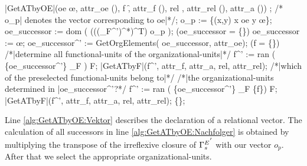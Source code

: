 	\begin{samepage}
	{\small
	\NumberProgramstrue
	\begin{algorithm}[GetATbyOE]\label{alg:GetATbyOE}
	\begin{program}
	\FUNCT |GetATbyOE|(oe \subset \oe, attr_{oe} \subset (\Bezeichner \times \WerteMenge), f \subset \f,
	attr_{f} \subset (\Bezeichner \times \WerteMenge), rel \in \relname, attr_{rel} \subset (\Bezeichner \times \WerteMenge),
	attr_a \subset (\Bezeichner \times \WerteMenge)) \subset \a
	\BEGIN
	\var {};
	/* o_{p}| denotes the vector corresponding to oe|*/;
	o_{p} := \{(x,y) \vert x \in oe \wedge y \in \oe \};\label{alg:GetATbyOE:Vektor}
	oe_{successor} := dom \left( \left({\left({\left({\relstrukturOE_F}^{'}\right)}^{*}\right)}^{T}\right) \circ o_{p} \right);\label{alg:GetATbyOE:Nachfolger}
	\IF (oe_{successor} = \{\})
	\THEN oe_{successor} := \oe; \label{alg:GetATbyOE:kritisch2}
	\FI
	oe_{successor}^{'} := GetOrgElements( oe_{successor}, attr_{oe});
	\IF (f = \{\})\label{alg:GetATbyOE:fIstNull}
	\THEN
		/*|determine all functional-units of the organizational-units|*/
		f^{'} := ran ( \{oe_{successor}^{'}\} \lhd \relstrukturOE_F ) \cap F;
		\RETURN \quad |GetATbyF|(f^{'}, attr_{f}, attr_a, rel, attr_{rel});
	\ELSE \label{alg:GetATbyOE:fIstNichtNull}
		/*|which of the preselected functional-units belong to|*/
		/*|the organizational-units determined in |oe_{successor}^{'}?*/
		f^{'} := ran ( \{oe_{successor}^{'}\} \lhd \relstrukturOE_F \rhd \{f\}) \cap F;
		\RETURN \quad |GetATbyF|(f^{'}, attr_{f}, attr_a, rel, attr_{rel});
	\FI
	\RETURN \quad \{\};
	\END
	\end{program}
	\end{algorithm}
	\NumberProgramsfalse
	}
	\end{samepage}

\noindent Line \ref{alg:GetATbyOE:Vektor} describes the declaration of a relational vector. The calculation of all successors in line \ref{alg:GetATbyOE:Nachfolger} is obtained by multiplying the transpose of the irreflexive closure of ${\relstrukturOE_F}^{'}$ with our vector $o_{p}$. After that we select the appropriate organizational-units.\\

